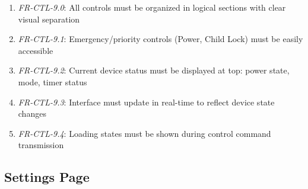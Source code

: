 \documentclass[conference]{IEEEtran}
\begin{document}
\begin{enumerate}
                        \begin{enumerate}
                            \item \textit{FR-CTL-9.0}: All controls must be organized in logical sections with clear visual separation
                            \item \textit{FR-CTL-9.1}: Emergency/priority controls (Power, Child Lock) must be easily accessible
                            \item \textit{FR-CTL-9.2}: Current device status must be displayed at top: power state, mode, timer status
                            \item \textit{FR-CTL-9.3}: Interface must update in real-time to reflect device state changes
                            \item \textit{FR-CTL-9.4}: Loading states must be shown during control command transmission
                        \end{enumerate}
                \end{enumerate}
        \subsection{\textbf{Settings Page}}
\end{document}
